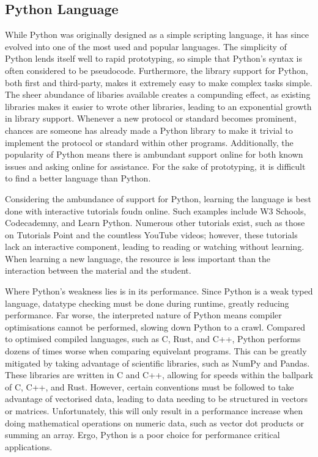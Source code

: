 \documentclass[11pt]{article}
\begin{document}
\subsection{Python Language}

While Python was originally designed as a simple scripting language, it has since evolved into one of the most used and popular languages. The simplicity of Python lends itself well to rapid prototyping, so simple that Python's syntax is often considered to be pseudocode. Furthermore, the library support for Python, both first and third-party, makes it extremely easy to make complex tasks simple. The sheer abundance of libaries available creates a compunding effect, as existing libraries makes it easier to wrote other libraries, leading to an exponential growth in library support. Whenever a new protocol or standard becomes prominent, chances are someone has already made a Python library to make it trivial to implement the protocol or standard within other programs. Additionally, the popularity of Python means there is ambundant support online for both known issues and asking online for assistance. For the sake of prototyping, it is difficult to find a better language than Python.

Considering the ambundance of support for Python, learning the language is best done with interactive tutorials foudn online. Such examples include W3 Schools, Codecademny, and Learn Python. Numerous other tutorials exist, such as those on Tutorials Point and the countless YouTube videos; however, these tutorials lack an interactive component, leading to reading or watching without learning. When learning a new language, the resource is less important than the interaction between the material and the student.

Where Python's weakness lies is in its performance. Since Python is a weak typed language, datatype checking must be done during runtime, greatly reducing performance. Far worse, the interpreted nature of Python means compiler optimisations cannot be performed, slowing down Python to a crawl. Compared to optimised compiled languages, such as C, Rust, and C++, Python performs dozens of times worse when comparing equivelant programs. This can be greatly mitigated by taking advantage of scientific libraries, such as NumPy and Pandas. These libraries are written in C and C++, allowing for speeds within the ballpark of C, C++, and Rust. However, certain conventions must be followed to take advantage of vectorised data, leading to data needing to be structured in vectors or matrices. Unfortunately, this will only result in a performance increase when doing mathematical operations on numeric data, such as vector dot products or summing an array. Ergo, Python is a poor choice for performance critical applications.
\end{document}
